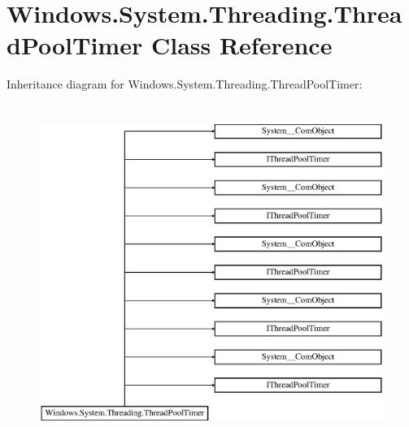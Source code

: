 \hypertarget{class_windows_1_1_system_1_1_threading_1_1_thread_pool_timer}{}\section{Windows.\+System.\+Threading.\+Thread\+Pool\+Timer Class Reference}
\label{class_windows_1_1_system_1_1_threading_1_1_thread_pool_timer}
Inheritance diagram for Windows.\+System.\+Threading.\+Thread\+Pool\+Timer\+:\begin{figure}[H]
\begin{center}
\leavevmode
\includegraphics[height=11.000000cm]{class_windows_1_1_system_1_1_threading_1_1_thread_pool_timer}
\end{center}
\end{figure}
